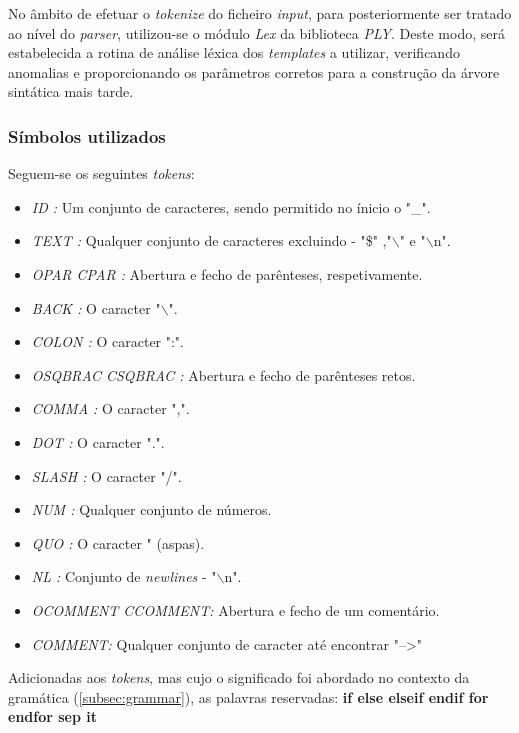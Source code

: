 \documentclass[../relatorio.tex]{subfiles}
\begin{document}
    No âmbito de efetuar o \textit{tokenize} do ficheiro \textit{input},
    para posteriormente ser tratado ao nível do \textit{parser}, 
    utilizou-se o módulo \textit{Lex} da biblioteca \textit{PLY}.
    Deste modo, será estabelecida a rotina de análise léxica 
    dos \textit{templates} a utilizar, verificando anomalias e
    proporcionando os parâmetros corretos para a construção da árvore 
    sintática mais tarde.

    \subsubsection{Símbolos utilizados}

    Seguem-se os seguintes \textit{tokens}:
    \begin{itemize}
        \item \textit{ID :} Um conjunto de caracteres, sendo permitido no ínicio o "\_".
        \item \textit{TEXT :} Qualquer conjunto de caracteres excluindo - "\$" ,"$\backslash$" e "$\backslash$n".
        \item \textit{OPAR CPAR :} Abertura e fecho de parênteses, respetivamente.
        \item \textit{BACK :} O caracter "$\backslash$".
        \item \textit{COLON :} O caracter ":".
        \item \textit{OSQBRAC CSQBRAC :} Abertura e fecho de parênteses retos.
        \item \textit{COMMA :} O caracter ",".
        \item \textit{DOT :} O caracter ".".
        \item \textit{SLASH :} O caracter "/".
        \item \textit{NUM :} Qualquer conjunto de números.
        \item \textit{QUO :} O caracter " (aspas).
        \item \textit{NL :} Conjunto de \textit{newlines} - "$\backslash$n".
        \item \textit{OCOMMENT CCOMMENT: } Abertura e fecho de um comentário.
        \item \textit{COMMENT: } Qualquer conjunto de caracter até encontrar "-->"
    \end{itemize}

    Adicionadas aos \textit{tokens}, mas cujo o significado foi abordado
    no contexto da gramática (\ref{subsec:grammar}), as palavras reservadas:
        \textbf{if else elseif endif for endfor sep it}
\end{document}
